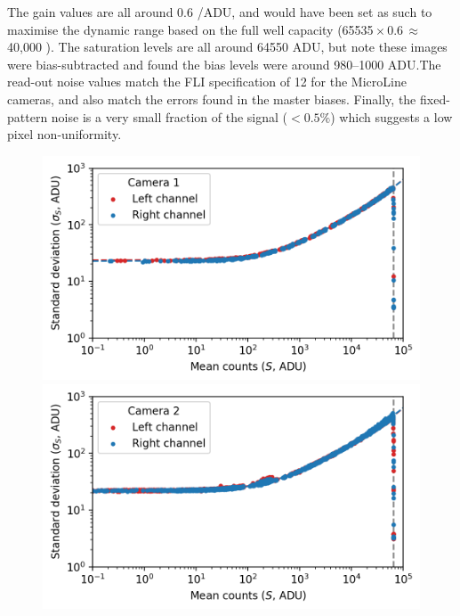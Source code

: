 \begin{colsection}
The gain values are all around 0.6 \elec/ADU, and would have been set as such to maximise the dynamic range based on the full well capacity (65535\,$\times$\,0.6\,$\approx$\,40,000 \elec). The saturation levels are all around 64550 ADU, but note these images were bias-subtracted and  found the bias levels were around 980--1000 ADU.\@ The read-out noise values match the FLI specification of 12 \elec{} for the MicroLine cameras, and also match the errors found in the master biases. Finally, the fixed-pattern noise is a very small fraction of the signal ($<0.5\%$) which suggests a low pixel non-uniformity.

\newpage

\begin{figure}[p]
    \begin{center}
        \begin{minipage}[t]{0.49\linewidth}\vspace{10pt}
            \includegraphics[width=\linewidth]{images/detectors/ptc_1.png}
        \end{minipage}
        \begin{minipage}[t]{0.49\linewidth}\vspace{10pt}
            \includegraphics[width=\linewidth]{images/detectors/ptc_2.png}
        \end{minipage}


\end{center}
\end{figure}
\end{colsection}
